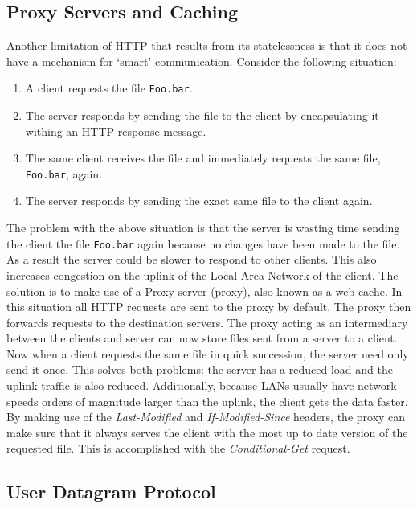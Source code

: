 \documentclass[10pt,twocolumn]{witseiepaper}
\begin{document}
	\subsection{Proxy Servers and Caching}
	\label{sec:proxy}
	Another limitation of HTTP that results from its statelessness is that it does not have a mechanism for `smart' communication. Consider the following situation:

	\begin{enumerate}
		\item A client requests the file \verb|Foo.bar|.
		\item The server responds by sending the file to the client by encapsulating it withing an HTTP response message.
		\item The same client receives the file and immediately requests the same file, \verb|Foo.bar|, again.
		\item The server responds by sending the exact same file to the client again.
	\end{enumerate} 

	The problem with the above situation is that the server is wasting time sending the client the file \verb|Foo.bar| again because no changes have been made to the file. As a result the server could be slower to respond to other clients. This also increases congestion on the uplink of the Local Area Network of the client. The solution is to make use of a Proxy server (proxy), also known as a web cache. In this situation all HTTP requests are sent to the proxy by default. The proxy then forwards requests to the destination servers. The proxy acting as an intermediary between the clients and server can now store files sent from a server to a client. Now when a client requests the same file in quick succession, the server need only send it once. This solves both problems: the server has a reduced load and the uplink traffic is also reduced. Additionally, because LANs usually have network speeds orders of magnitude larger than the uplink, the client gets the data faster. By making use of the \emph{Last-Modified} and \emph{If-Modified-Since} headers, the proxy can make sure that it always serves the client with the most up to date version of the requested file. This is accomplished with the \emph{Conditional-Get} request. 	

	\subsection{User Datagram Protocol}
\end{document}
